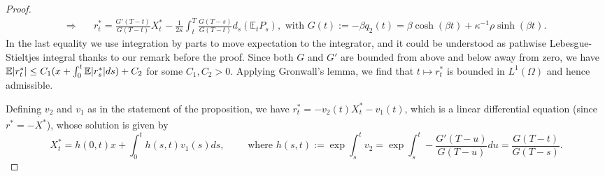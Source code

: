 \documentclass[openany,oneside]{article}
\theoremstyle{definition}
\theoremstyle{remark}
\newcommand{\E}{\mathbb{E}} %
\DeclarePairedDelimiter{\abs}{\lvert}{\rvert} %
\newcommand{\ts}{\textstyle}
\begin{document}
\begin{proof}
\begin{align*}
\Rightarrow\quad &\ts r^\ast_t = \frac{G'(T-t)}{G(T-t)} X^\ast_t - \frac{1}{2\kappa} \int_t^T \frac{G(T-s)}{G(T-t)} d_s(\E_t P_s), \textrm{ with } G(t):=-\beta q_2(t) = \beta\cosh(\beta t)+\kappa^{-1}\rho\sinh(\beta t).
\end{align*}
In the last equality we use integration by parts to move expectation to the integrator, and it could be understood as pathwise Lebesgue-Stieltjes integral thanks to our remark before the proof. Since both $G$ and $G'$ are bounded from above and below away from zero, we have $\E\abs{r^\ast_t} \le C_1 (x+\int_0^t \E\abs{r^\ast_s} ds) + C_2$ for some $C_1, C_2 > 0$. Applying Gronwall's lemma, we find that $t\mapsto r^\ast_t$ is bounded in $L^1(\Omega)$ and hence admissible.

Defining $v_2$ and $v_1$ as in the statement of the proposition, we have $r^\ast_t = -v_2(t)X^\ast_t -v_1(t)$, which is a linear differential equation (since $r^\ast=-\dot{X^\ast}$), whose solution is given by
\[
\ts X^\ast_t = h(0,t)x + \int_0^t h(s,t)v_1(s) ds,\qquad \textrm{ where } h(s,t):=\exp\int_s^t v_2 = \exp\int_s^t -\frac{G'(T-u)}{G(T-u)}du=\frac{G(T-t)}{G(T-s)}.
\]


\end{proof}
\end{document}
